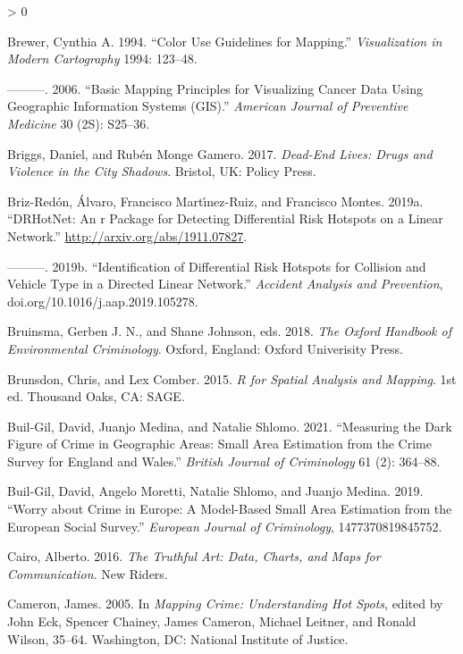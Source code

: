 \documentclass[
  krantz2]{krantz}
\newlength{\cslhangindent}
\newenvironment{CSLReferences}[2] %
 {%
  \setlength{\parindent}{0pt}
  \ifodd #1 \everypar{\setlength{\hangindent}{\cslhangindent}}\ignorespaces\fi
  \ifnum #2 > 0
  \setlength{\parskip}{#2\baselineskip}
  \fi
 }%
 {}
\begin{document}
\begin{CSLReferences}{1}{0}
\leavevmode\hypertarget{ref-Brewer_1994}{}%
Brewer, Cynthia A. 1994. {``Color Use Guidelines for Mapping.''} \emph{Visualization in Modern Cartography} 1994: 123--48.

\leavevmode\hypertarget{ref-Brewer_2006}{}%
---------. 2006. {``Basic Mapping Principles for Visualizing Cancer Data Using Geographic Information Systems (GIS).''} \emph{American Journal of Preventive Medicine} 30 (2S): S25--36.

\leavevmode\hypertarget{ref-Briggs_2017}{}%
Briggs, Daniel, and Rubén Monge Gamero. 2017. \emph{Dead-End Lives: Drugs and Violence in the City Shadows}. Bristol, UK: Policy Press.

\leavevmode\hypertarget{ref-BrizRedon_2019a}{}%
Briz-Redón, Álvaro, Francisco Martı́nez-Ruiz, and Francisco Montes. 2019a. {``DRHotNet: An r Package for Detecting Differential Risk Hotspots on a Linear Network.''} \url{http://arxiv.org/abs/1911.07827}.

\leavevmode\hypertarget{ref-BrizRedon_2019b}{}%
---------. 2019b. {``Identification of Differential Risk Hotspots for Collision and Vehicle Type in a Directed Linear Network.''} \emph{Accident Analysis and Prevention}, doi.org/10.1016/j.aap.2019.105278.

\leavevmode\hypertarget{ref-Bruinsma_2018}{}%
Bruinsma, Gerben J. N., and Shane Johnson, eds. 2018. \emph{The Oxford Handbook of Environmental Criminology}. Oxford, England: Oxford Univerisity Press.

\leavevmode\hypertarget{ref-Brunsdon_2015}{}%
Brunsdon, Chris, and Lex Comber. 2015. \emph{R for Spatial Analysis and Mapping}. 1st ed. Thousand Oaks, CA: SAGE.

\leavevmode\hypertarget{ref-Buil-Gil_2021}{}%
Buil-Gil, David, Juanjo Medina, and Natalie Shlomo. 2021. {``Measuring the Dark Figure of Crime in Geographic Areas: Small Area Estimation from the Crime Survey for England and Wales.''} \emph{British Journal of Criminology} 61 (2): 364--88.

\leavevmode\hypertarget{ref-Buil_2019}{}%
Buil-Gil, David, Angelo Moretti, Natalie Shlomo, and Juanjo Medina. 2019. {``Worry about Crime in Europe: A Model-Based Small Area Estimation from the European Social Survey.''} \emph{European Journal of Criminology}, 1477370819845752.

\leavevmode\hypertarget{ref-Cairo_2016}{}%
Cairo, Alberto. 2016. \emph{The Truthful Art: Data, Charts, and Maps for Communication}. New Riders.

\leavevmode\hypertarget{ref-Cameron_2005}{}%
Cameron, James. 2005. In \emph{Mapping Crime: Understanding Hot Spots}, edited by John Eck, Spencer Chainey, James Cameron, Michael Leitner, and Ronald Wilson, 35--64. Washington, DC: National Institute of Justice.


\end{CSLReferences}
\end{document}
